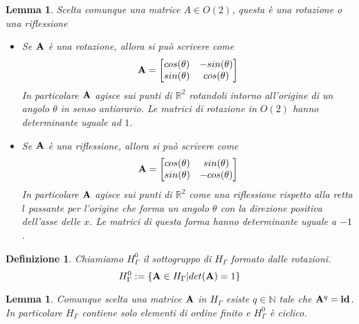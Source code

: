 \documentclass[a4paper,11pt,openright,twoside	]{book}
\newtheorem{definition}{Definizione}[section]
\newtheorem{lemma}[theorem]{Lemma}
\begin{document}
\begin{lemma}
Scelta comunque una matrice $A \in O(2)$, questa è una rotazione o una riflessione
\begin{itemize}
\item Se $\vb{A}$ è una rotazione, allora si può scrivere come \begin{equation}
\vb{A} = \begin{bmatrix}{}
cos(\theta) & -sin(\theta) \\ 
sin(\theta) & cos(\theta) \\
\end{bmatrix}
\end{equation}
In particolare $\vb{A}$ agisce sui punti di $\mathbb{R}^2$ rotandoli intorno all'origine di un angolo $\theta$ in senso antiorario. Le matrici di rotazione in $O(2)$ hanno determinante uguale ad $1$. 
\item Se $\vb{A}$ è una riflessione, allora si può scrivere come \begin{equation} 
\vb{A} = \begin{bmatrix}{}
cos(\theta) & sin(\theta) \\ 
sin(\theta) & -cos(\theta) \\
\end{bmatrix}
\end{equation}
In particolare $\vb{A}$ agisce sui punti di $\mathbb{R}^2$ come una riflessione rispetto alla retta $l$ passante per l'origine che forma un angolo $\theta$ con la direzione positiva dell'asse delle $x$. Le matrici di questa forma hanno determinante uguale a $-1$. 
\end{itemize}
\end{lemma}
\begin{definition}
Chiamiamo $H_{\Gamma}^0$ il sottogruppo di $H_{\Gamma}$ formato dalle rotazioni.
\[ H_{\Gamma}^0 := \{ \vb{A} \in H_{\Gamma} | det(\vb{A}) = 1 \} \]
\end{definition}
\begin{lemma}
\label{lemma:q}
Comunque scelta una matrice $\vb{A}$ in $H_{\Gamma}$ esiste $q \in \mathbb{N}$ tale che $\vb{A}^q = \vb{id}$. In particolare $H_{\Gamma}$ contiene solo elementi di ordine finito e $H_{\Gamma}^0$ è ciclico. 
\end{lemma}
\end{document}
